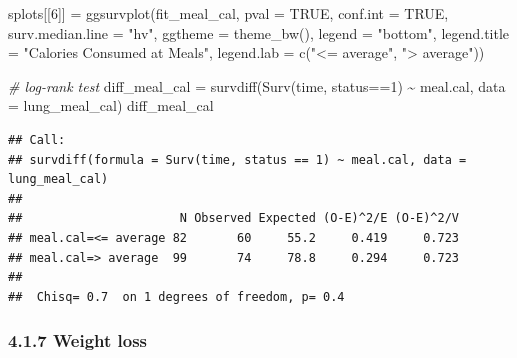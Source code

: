 \documentclass[
]{article}
\newenvironment{Shaded}{\begin{snugshade}}{\end{snugshade}}
\newcommand{\AttributeTok}[1]{\textcolor[rgb]{0.77,0.63,0.00}{#1}}
\newcommand{\CommentTok}[1]{\textcolor[rgb]{0.56,0.35,0.01}{\textit{#1}}}
\newcommand{\ConstantTok}[1]{\textcolor[rgb]{0.00,0.00,0.00}{#1}}
\newcommand{\DecValTok}[1]{\textcolor[rgb]{0.00,0.00,0.81}{#1}}
\newcommand{\FunctionTok}[1]{\textcolor[rgb]{0.00,0.00,0.00}{#1}}
\newcommand{\NormalTok}[1]{#1}
\newcommand{\OtherTok}[1]{\textcolor[rgb]{0.56,0.35,0.01}{#1}}
\newcommand{\SpecialCharTok}[1]{\textcolor[rgb]{0.00,0.00,0.00}{#1}}
\newcommand{\StringTok}[1]{\textcolor[rgb]{0.31,0.60,0.02}{#1}}
\begin{document}
\begin{Shaded}
\begin{Highlighting}[]
\NormalTok{splots[[}\DecValTok{6}\NormalTok{]] }\OtherTok{=} \FunctionTok{ggsurvplot}\NormalTok{(fit\_meal\_cal, }
                         \AttributeTok{pval =} \ConstantTok{TRUE}\NormalTok{, }\AttributeTok{conf.int =} \ConstantTok{TRUE}\NormalTok{,}
                         \AttributeTok{surv.median.line =} \StringTok{"hv"}\NormalTok{, }
                         \AttributeTok{ggtheme =} \FunctionTok{theme\_bw}\NormalTok{(), }
                         \AttributeTok{legend =} \StringTok{"bottom"}\NormalTok{,}
                         \AttributeTok{legend.title =} \StringTok{"Calories Consumed at Meals"}\NormalTok{,}
                         \AttributeTok{legend.lab =} \FunctionTok{c}\NormalTok{(}\StringTok{"\textless{}= average"}\NormalTok{, }\StringTok{"\textgreater{} average"}\NormalTok{))}

\CommentTok{\# log{-}rank test}
\NormalTok{diff\_meal\_cal }\OtherTok{=} \FunctionTok{survdiff}\NormalTok{(}\FunctionTok{Surv}\NormalTok{(time, status}\SpecialCharTok{==}\DecValTok{1}\NormalTok{) }\SpecialCharTok{\textasciitilde{}}\NormalTok{ meal.cal, }\AttributeTok{data =}\NormalTok{ lung\_meal\_cal) }
\NormalTok{diff\_meal\_cal}
\end{Highlighting}
\end{Shaded}

\begin{verbatim}
## Call:
## survdiff(formula = Surv(time, status == 1) ~ meal.cal, data = lung_meal_cal)
## 
##                      N Observed Expected (O-E)^2/E (O-E)^2/V
## meal.cal=<= average 82       60     55.2     0.419     0.723
## meal.cal=> average  99       74     78.8     0.294     0.723
## 
##  Chisq= 0.7  on 1 degrees of freedom, p= 0.4
\end{verbatim}

\hypertarget{weight-loss}{%
\subsubsection{4.1.7 Weight loss}\label{weight-loss}}
\end{document}
